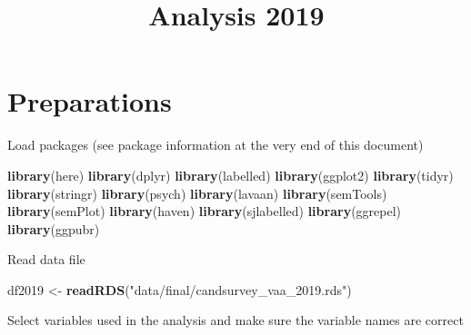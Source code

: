\documentclass[
]{article}
\title{Analysis 2019}
\author{}
\date{\vspace{-2.5em}}
\newenvironment{Shaded}{\begin{snugshade}}{\end{snugshade}}
\newcommand{\KeywordTok}[1]{\textcolor[rgb]{0.13,0.29,0.53}{\textbf{#1}}}
\newcommand{\NormalTok}[1]{#1}
\newcommand{\OperatorTok}[1]{\textcolor[rgb]{0.81,0.36,0.00}{\textbf{#1}}}
\newcommand{\StringTok}[1]{\textcolor[rgb]{0.31,0.60,0.02}{#1}}
\begin{document}
\maketitle

{
\setcounter{tocdepth}{4}
\tableofcontents
}
\newpage

\hypertarget{preparations}{%
\section{Preparations}\label{preparations}}

Load packages (see package information at the very end of this document)

\begin{Shaded}
\begin{Highlighting}[]
\KeywordTok{library}\NormalTok{(here)}
\KeywordTok{library}\NormalTok{(dplyr)}
\KeywordTok{library}\NormalTok{(labelled)}
\KeywordTok{library}\NormalTok{(ggplot2)}
\KeywordTok{library}\NormalTok{(tidyr)}
\KeywordTok{library}\NormalTok{(stringr)}
\KeywordTok{library}\NormalTok{(psych)}
\KeywordTok{library}\NormalTok{(lavaan)}
\KeywordTok{library}\NormalTok{(semTools)}
\KeywordTok{library}\NormalTok{(semPlot)}
\KeywordTok{library}\NormalTok{(haven)}
\KeywordTok{library}\NormalTok{(sjlabelled)}
\KeywordTok{library}\NormalTok{(ggrepel)}
\KeywordTok{library}\NormalTok{(ggpubr)}
\end{Highlighting}
\end{Shaded}

Read data file

\begin{Shaded}
\begin{Highlighting}[]
\NormalTok{df2019 <-}\StringTok{ }\KeywordTok{readRDS}\NormalTok{(}\StringTok{"data/final/candsurvey_vaa_2019.rds"}\NormalTok{)}
\end{Highlighting}
\end{Shaded}

Select variables used in the analysis and make sure the variable names
are correct

\begin{Shaded}
\end{Shaded}
\end{document}

